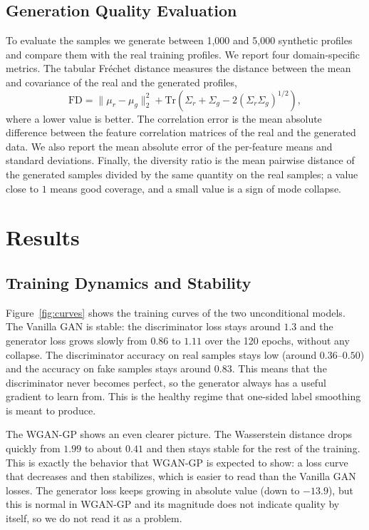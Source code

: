 \documentclass[10pt,twocolumn]{article}
\begin{document}
\subsection{Generation Quality Evaluation}

To evaluate the samples we generate between 1{,}000 and 5{,}000 synthetic profiles and compare
them with the real training profiles. We report four domain-specific metrics. The tabular
Fr\'echet distance measures the distance between the mean and covariance of the real and the
generated profiles,
\begin{equation}
\text{FD} = \lVert \mu_r - \mu_g \rVert_2^2 +
\mathrm{Tr}\!\left(\Sigma_r + \Sigma_g - 2(\Sigma_r\Sigma_g)^{1/2}\right),
\label{eq:fd}
\end{equation}
where a lower value is better. The correlation error is the mean absolute difference between the
feature correlation matrices of the real and the generated data. We also report the mean
absolute error of the per-feature means and standard deviations. Finally, the diversity ratio is
the mean pairwise distance of the generated samples divided by the same quantity on the real
samples; a value close to $1$ means good coverage, and a small value is a sign of mode collapse.

\section{Results}

\subsection{Training Dynamics and Stability}

Figure~\ref{fig:curves} shows the training curves of the two unconditional models. The Vanilla
GAN is stable: the discriminator loss stays around $1.3$ and the generator loss grows slowly
from $0.86$ to $1.11$ over the 120 epochs, without any collapse. The discriminator accuracy on
real samples stays low (around $0.36$--$0.50$) and the accuracy on fake samples stays around
$0.83$. This means that the discriminator never becomes perfect, so the generator always has a
useful gradient to learn from. This is the healthy regime that one-sided label smoothing is
meant to produce.

The WGAN-GP shows an even clearer picture. The Wasserstein distance drops quickly from $1.99$
to about $0.41$ and then stays stable for the rest of the training. This is exactly the
behavior that WGAN-GP is expected to show: a loss curve that decreases and then stabilizes,
which is easier to read than the Vanilla GAN losses. The generator loss keeps growing in
absolute value (down to $-13.9$), but this is normal in WGAN-GP and its magnitude does not
indicate quality by itself, so we do not read it as a problem.
\end{document}
